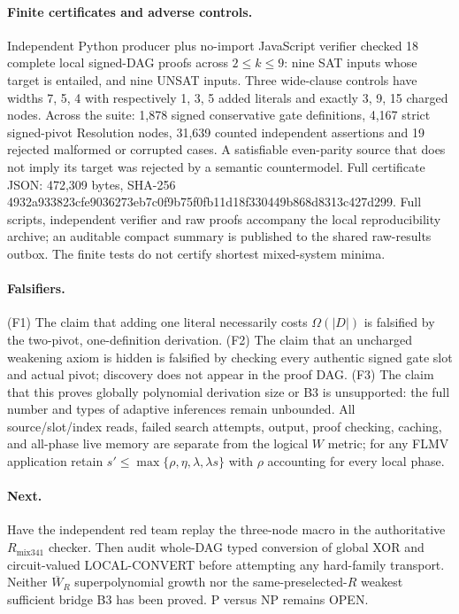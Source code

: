 \documentclass[11pt]{article}
\begin{document}
\paragraph{Finite certificates and adverse controls.} Independent Python producer plus no-import JavaScript verifier checked 18 complete local signed-DAG proofs across $2\le k\le9$: nine SAT inputs whose target is entailed, and nine UNSAT inputs. Three wide-clause controls have widths 7, 5, 4 with respectively 1, 3, 5 added literals and exactly 3, 9, 15 charged nodes. Across the suite: 1,878 signed conservative gate definitions, 4,167 strict signed-pivot Resolution nodes, 31,639 counted independent assertions and 19 rejected malformed or corrupted cases. A satisfiable even-parity source that does not imply its target was rejected by a semantic countermodel. Full certificate JSON: 472,309 bytes, SHA-256 4932a933823cfe9036273eb7c0f9b75f0fb11d18f330449b868d8313c427d299. Full scripts, independent verifier and raw proofs accompany the local reproducibility archive; an auditable compact summary is published to the shared raw-results outbox. The finite tests do not certify shortest mixed-system minima.

\paragraph{Falsifiers.} (F1) The claim that adding one literal necessarily costs $\Omega(|D|)$ is falsified by the two-pivot, one-definition derivation. (F2) The claim that an uncharged weakening axiom is hidden is falsified by checking every authentic signed gate slot and actual pivot; discovery does not appear in the proof DAG. (F3) The claim that this proves globally polynomial derivation size or B3 is unsupported: the full number and types of adaptive inferences remain unbounded. All source/slot/index reads, failed search attempts, output, proof checking, caching, and all-phase live memory are separate from the logical $W$ metric; for any FLMV application retain $s'\le\max\{\rho,\eta,\lambda,\lambda s\}$ with $\rho$ accounting for every local phase.

\paragraph{Next.} Have the independent red team replay the three-node macro in the authoritative $R_{\mathrm{mix341}}$ checker. Then audit whole-DAG typed conversion of global XOR and circuit-valued LOCAL-CONVERT before attempting any hard-family transport. Neither $\overline W_R$ superpolynomial growth nor the same-preselected-$R$ weakest sufficient bridge B3 has been proved. P versus NP remains OPEN.
\end{document}
